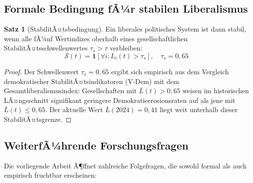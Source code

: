 ﻿\documentclass[a4paper,12pt]{article}
\theoremstyle{definition}
\newtheorem{satz}{Satz}
\begin{document}
\subsection{Formale Bedingung fÃ¼r stabilen Liberalismus}

\begin{satz}[StabilitÃ¤tsbedingung]
Ein liberales politisches System ist dann stabil, wenn alle fÃ¼nf Wertindizes oberhalb eines gesellschaftlichen StabilitÃ¤tsschwellenwertes $\tau_s > \tau$ verbleiben:
\[
\mathcal{S}(t) = \mathbf{1}\!\left[\forall i: L_i(t) > \tau_s\right], \quad \tau_s = 0{,}65
\]
\end{satz}

\begin{proof}
Der Schwellenwert $\tau_s = 0{,}65$ ergibt sich empirisch aus dem Vergleich demokratischer StabilitÃ¤tsindikatoren (V-Dem) mit dem Gesamtliberalismusindex: Gesellschaften mit $\bar{L}(t) > 0{,}65$ weisen im historischen LÃ¤ngsschnitt signifikant geringere Demokratieerosionsraten auf als jene mit $\bar{L}(t) \leq 0{,}65$. Der aktuelle Wert $\bar{L}(2024) = 0{,}41$ liegt weit unterhalb dieser StabilitÃ¤tsgrenze. \qedhere
\end{proof}

\subsection{WeiterfÃ¼hrende Forschungsfragen}

Die vorliegende Arbeit Ã¶ffnet zahlreiche Folgefragen, die sowohl formal als auch empirisch fruchtbar erscheinen:
\end{document}

